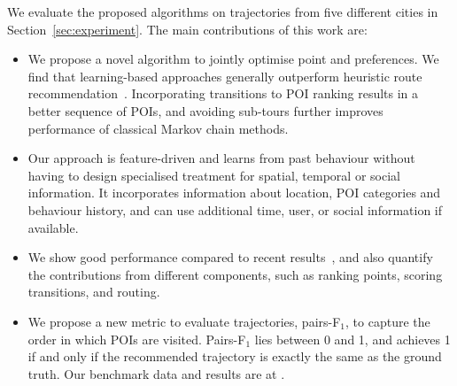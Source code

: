 We evaluate the proposed algorithms on trajectories from five different cities in Section~\ref{sec:experiment}.
The main contributions of this work are:
\begin{itemize}
\setlength{\itemsep}{-2pt}
\item We propose a novel algorithm to jointly optimise point and preferences. We find that learning-based approaches generally outperform heuristic route recommendation~\cite{ijcai15}.
Incorporating transitions to POI ranking results in a better sequence of POIs, and avoiding sub-tours further improves performance of classical Markov chain methods.
\item Our approach is feature-driven and learns from past behaviour without having to design specialised treatment for spatial, temporal or social information. It incorporates information about location, POI categories and behaviour history, and can use additional time, user, or social information if available.
\item We show good performance compared to recent results~\cite{ijcai15}, and also quantify the contributions from different components, such as ranking points, scoring transitions, and routing.
\item We propose a new metric to evaluate trajectories, pairs-F$_1$, to capture the order in which POIs are visited. Pairs-F$_1$ lies between 0 and 1, and achieves 1 if and only if the recommended trajectory is exactly the same as the ground truth. Our benchmark data and results are at .
\end{itemize}
